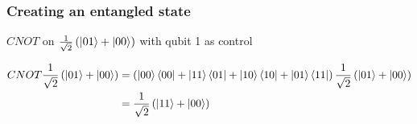 \documentclass[10pt]{beamer}
\begin{document}
\begin{frame}
  \frametitle{Creating an entangled state}
  \begin{block}{$CNOT$ on $\frac{1}{\sqrt{2}}\left( \ket{01}+\ket{00} \right)$ with qubit 1 as control}
    
    \scriptsize
\begin{align*}
  CNOT \frac{1}{\sqrt{2}}\left( \ket{01}+\ket{00} \right) &= \left( \ket{00}\bra{00}+\ket{11}\bra{01}+\ket{10}\bra{10}+\ket{01}\bra{11} \right)\frac{1}{\sqrt{2}}\left( \ket{01}+\ket{00} \right) \\
  &= \frac{1}{\sqrt{2}}\left( \ket{11} + \ket{00} \right)
\end{align*}
    
  \end{block}
\end{frame}
\end{document}
